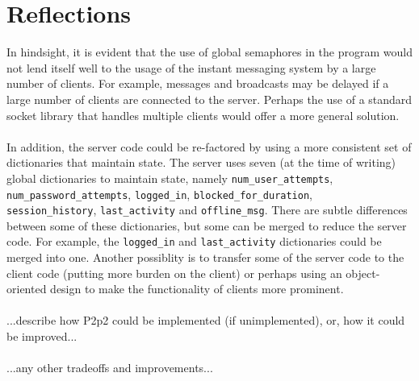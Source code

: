 \documentclass[12pt,a4paper]{article}
\begin{document}
\section{Reflections}
\label{sec:reflections}

In hindsight, it is evident that the use of global semaphores in the program would not lend itself well to the usage of the instant messaging system by a large number of clients. For example, messages and broadcasts may be delayed if a large number of clients are connected to the server. Perhaps the use of a standard socket library that handles multiple clients would offer a more general solution.
\\\\
In addition, the server code could be re-factored by using a more consistent set of dictionaries that maintain state. The server uses seven (at the time of writing) global dictionaries to maintain state, namely	\verb|num_user_attempts|, \verb|num_password_attempts|, \verb|logged_in|, \verb|blocked_for_duration|, \\ \verb|session_history|, \verb|last_activity| and \verb|offline_msg|. There are subtle differences between some of these dictionaries, but some can be merged to reduce the server code. For example, the \verb|logged_in| and \verb|last_activity| dictionaries could be merged into one. Another possiblity is to transfer some of the server code to the client code (putting more burden on the client) or perhaps using an object-oriented design to make the functionality of clients more prominent.
\\\\
...describe how P2p2 could be implemented (if unimplemented), or, how it could be improved...
\\\\
...any other tradeoffs and improvements...
\end{document}
